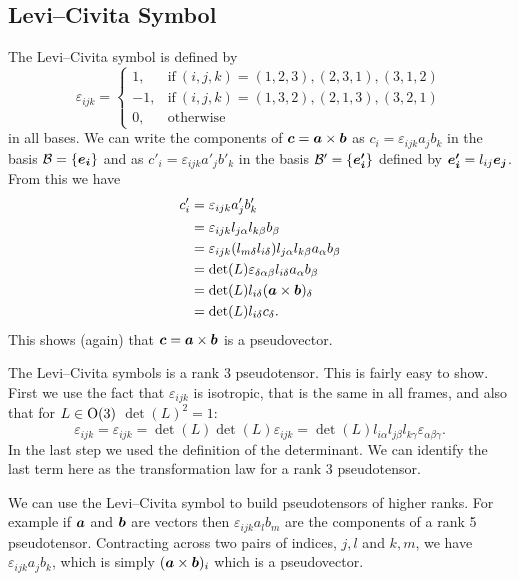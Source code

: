 \subsection{Levi--Civita Symbol}
The Levi--Civita symbol is defined by
\[
\varepsilon_{ijk} = 
\begin{cases}
    1,  & \text{if}~(i, j, k) = (1, 2, 3), (2, 3, 1), (3, 1, 2)\\
    -1, & \text{if}~(i, j, k) = (1, 3, 2), (2, 1, 3), (3, 2, 1)\\
    0,  & \text{otherwise}
\end{cases}
\]
in all bases.
We can write the components of \(\bm{c} = \bm{a}\times\bm{b}\) as \(c_i = \varepsilon_{ijk}a_jb_k\) in the basis \(\mathcal{B} = \{\bm{e_{i}}\}\) and as \(c'_i = \varepsilon_{ijk}a'_jb'_k\) in the basis \(\mathcal{B}' = \{\bm{e'_i}\}\) defined by \(\bm{e'_i} = l_{ij}\bm{e_{j}}\).
From this we have
\begin{align*}
    c'_i &= \varepsilon_{ijk}a'_jb'_k\\
    &= \varepsilon_{ijk}l_{j\alpha}l_{k\beta}b_\beta\\
    &= \varepsilon_{ijk}(l_{m\delta}l_{i\delta})l_{j\alpha}l_{k\beta}a_\alpha b_\beta\\
    &= \det(L) \varepsilon_{\delta\alpha\beta}l_{i\delta}a_\alpha b_\beta\\
    &= \det(L) l_{i\delta}(\bm{a}\times\bm{b})_{\delta}\\
    &= \det(L)l_{i\delta}c_{\delta}.
\end{align*}
This shows (again) that \(\bm{c} = \bm{a}\times\bm{b}\) is a pseudovector.

The Levi--Civita symbols is a rank 3 pseudotensor.
This is fairly easy to show.
First we use the fact that \(\varepsilon_{ijk}\) is isotropic, that is the same in all frames, and also that for \(L\in\mathrm{O}(3)\) \(\det(L)^2 = 1\):
\[\varepsilon_{ijk} = \varepsilon_{ijk} = \det(L)\det(L)\varepsilon_{ijk} = \det(L)l_{i\alpha}l_{j\beta}l_{k\gamma}\varepsilon_{\alpha\beta\gamma}.\]
In the last step we used the definition of the determinant.
We can identify the last term here as the transformation law for a rank 3 pseudotensor.

We can use the Levi--Civita symbol to build pseudotensors of higher ranks.
For example if \(\bm{a}\) and \(\bm{b}\) are vectors then \(\varepsilon_{ijk}a_lb_m\) are the components of a rank 5 pseudotensor.
Contracting across two pairs of indices, \(j, l\) and \(k, m\), we have \(\varepsilon_{ijk}a_jb_k\), which is simply \((\bm{a}\times\bm{b})_i\) which is a pseudovector.

